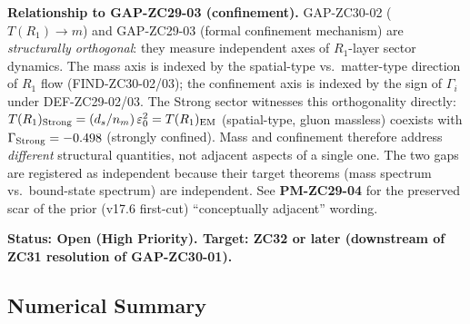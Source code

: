 \documentclass[12pt, a4paper]{article}
\begin{document}
\begin{openqbox}[title={GAP-ZC30-02: Formal $T(R_1) \to m$
  Connection (NEW v17.6 patch, High Priority)}]
\textbf{Relationship to GAP-ZC29-03 (confinement).}
GAP-ZC30-02 ($T(R_1) \to m$) and GAP-ZC29-03 (formal
confinement mechanism) are \emph{structurally orthogonal}:
they measure independent axes of $R_1$-layer sector
dynamics. The mass axis is indexed by the spatial-type
vs.\ matter-type direction of $R_1$ flow (FIND-ZC30-02/03);
the confinement axis is indexed by the sign of $\Gamma_i$
under DEF-ZC29-02/03. The Strong sector witnesses this
orthogonality directly: $T(R_1)_{\rm Strong} =
(d_s/n_m)\,\varepsilon_0^2 = T(R_1)_{\rm EM}$ (spatial-type,
gluon massless) coexists with $\Gamma_{\rm Strong} = -0.498$
(strongly confined). Mass and confinement therefore address
\emph{different} structural quantities, not adjacent aspects
of a single one. The two gaps are registered as independent
because their target theorems (mass spectrum vs.\
bound-state spectrum) are independent. See
\textbf{PM-ZC29-04} for the preserved scar of the prior
(v17.6 first-cut) ``conceptually adjacent'' wording.

\textbf{Status: Open (High Priority). Target: ZC32 or later
(downstream of ZC31 resolution of GAP-ZC30-01).}
\end{openqbox}

\subsection{Numerical Summary}
\label{zc30:sec:numerical}
\end{document}
